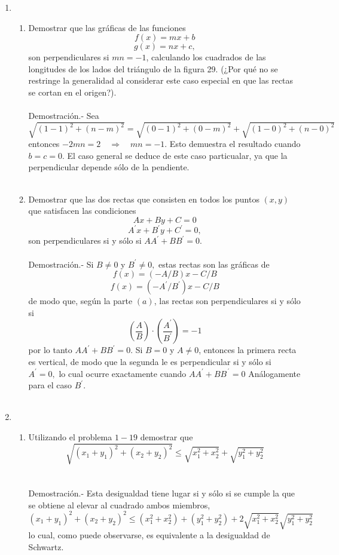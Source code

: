 \begin{enumerate}[\bfseries 1.]
    \item 
    \begin{enumerate}[\bfseries (a)]

	\item Demostrar que las gráficas de las funciones $$f(x)=mx+b$$ $$g(x)=nx+c,$$ son perpendiculares si $mn=-1$, calculando los cuadrados de las longitudes de los lados del triángulo de la figura 29. (¿Por qué no se restringe la generalidad al considerar este caso especial en que las rectas se cortan en el origen?).\\\\
	    Demostración.-\; Sea $\sqrt{(1-1)^2+(n-m)^2} = \sqrt{(0-1)^2+(0-m)^2} + \sqrt{(1-0)^2+(n-0)^2}$ entonces $-2mn=2 \quad \Rightarrow \quad mn=-1$. Esto demuestra el resultado cuando $b=c=0$. El caso general se deduce de este caso particualar, ya que la perpendicular depende sólo de la pendiente.\\\\

	\item Demostrar que las dos rectas que consisten en todos los puntos $(x,y)$ que satisfacen las condiciones $$Ax +By +C=0$$ $$A^{'}x + B^{'} y + C^{'} = 0,$$ son perpendiculares si y sólo si $AA^{'} + BB^{'} = 0$.\\\\
	    Demostración.-\; Si $B\neq 0$ y $B^{'} \neq 0,$ estas rectas son las gráficas de $$f(x)=(-A/B)x - C/B$$ $$f(x)=(-A^{'}/B^{'})x - C/B$$ de modo que, según la parte $(a)$, las rectas son perpendiculares si y sólo si $$\left(\dfrac{A}{B}\right)\cdot \left(\dfrac{A^{'}}{B^{'}}\right)=-1$$ por lo tanto $AA^{'}+BB^{'}=0$. Si $B=0$ y $A\neq 0$, entonces la primera recta es vertical, de modo que la segunda le es perpendicular si y sólo si $A^{'}=0,$ lo cual ocurre exactamente cuando $AA^{'} + BB^{´}=0$ Análogamente para el caso $B^{'}$.\\\\

    \end{enumerate}
    
    \item  
    \begin{enumerate}[\bfseries (a)]

	\item Utilizando el problema $1-19$ demostrar que $$\sqrt{(x_1+y_1)^2 + (x_2+y_2)^2} \leq \sqrt{x_1^2 + x_2^2} + \sqrt{y_1^2 + y_2^2}$$\\\\
	    Demostración.-\; Esta desigualdad tiene lugar si y sólo si se cumple la que se obtiene al elevar al cuadrado ambos miembros, $$(x_1+y_1)^2+(x_2+y_2)^2\leq (x_1^2+x_2^2)+(y_1^2+y_2^2)+2\sqrt{x_1^2+x_2^2}\sqrt{y_1^2+y_2^2}$$ lo cual, como puede observarse, es equivalente a la desigualdad de Schwartz.\\\\


\end{enumerate}
\end{enumerate}
